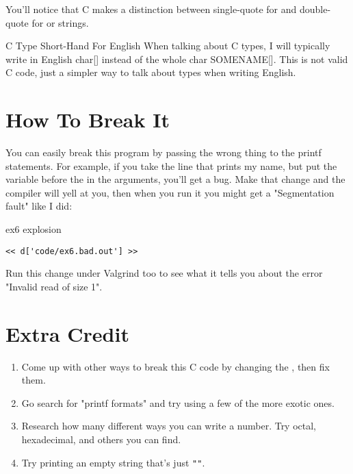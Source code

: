 You'll notice that C makes a distinction between single-quote for 
and double-quote for  or strings.


\begin{aside}{C Type Short-Hand For English}
When talking about C types, I will typically write in English char[] instead of the whole char SOMENAME[].
This is not valid C code, just a simpler way to talk about types when writing English.
\end{aside}

\section{How To Break It}

You can easily break this program by passing the wrong thing to the 
printf statements.  For example, if you take the line that prints
my name, but put the  variable before the 
in the arguments, you'll get a bug.  Make that change and the compiler will
yell at you, then when you run it you might get a "Segmentation fault"
like I did:

\begin{code}{ex6 explosion}
\begin{lstlisting}
<< d['code/ex6.bad.out'] >>
\end{lstlisting}
\end{code}

Run this change under Valgrind too to see what it tells you about
the error "Invalid read of size 1".

\section{Extra Credit}

\begin{enumerate}
\item Come up with other ways to break this C code by changing the
    , then fix them.
\item Go search for "printf formats" and try using a few of the
    more exotic ones.
\item Research how many different ways you can write a number. Try
    octal, hexadecimal, and others you can find.
\item Try printing an empty string that's just \verb|""|.
\end{enumerate}

